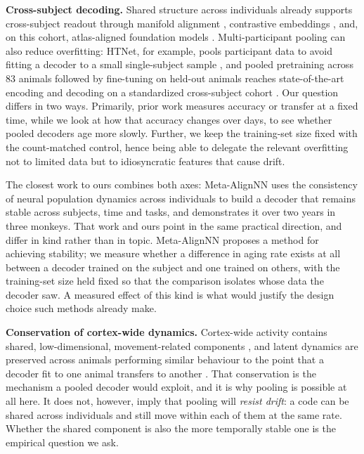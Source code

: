 \documentclass{article}
\begin{document}
\textbf{Cross-subject decoding.} Shared structure across individuals already supports cross-subject
readout through manifold alignment \citep{melbaum2022}, contrastive embeddings \citep{schneider2023},
and, on this cohort, atlas-aligned foundation models \citep{wicat2026}. Multi-participant pooling can
also reduce overfitting: HTNet, for example, pools participant data to avoid fitting a decoder to a
small single-subject sample \citep{peterson2021}, and pooled pretraining across 83 animals followed
by fine-tuning on held-out animals reaches state-of-the-art encoding and decoding on a standardized
cross-subject cohort \citep{neds2025}. Our question differs in two ways. Primarily, prior work
measures accuracy or transfer at a fixed time, while we look at how that accuracy changes over days,
to see whether pooled decoders age more slowly. Further, we keep the training-set size fixed with the
count-matched control, hence being able to delegate the relevant overfitting not to limited data but
to idiosyncratic features that cause drift.

The closest work to ours combines both axes: Meta-AlignNN \citep{metaalign2025} uses the consistency
of neural population dynamics across individuals to build a decoder that remains stable across
subjects, time and tasks, and demonstrates it over two years in three monkeys. That work and ours
point in the same practical direction, and differ in kind rather than in topic. Meta-AlignNN proposes
a method for achieving stability; we measure whether a difference in aging rate exists at all between
a decoder trained on the subject and one trained on others, with the training-set size held fixed so
that the comparison isolates whose data the decoder saw. A measured effect of this kind is what would
justify the design choice such methods already make.

\textbf{Conservation of cortex-wide dynamics.} Cortex-wide activity contains shared,
low-dimensional, movement-related components \citep{musall2019,macdowell2020,macdowell2024}, and
latent dynamics are preserved across animals performing similar behaviour to the point that a decoder
fit to one animal transfers to another \citep{safaie2023}. That conservation is the mechanism a
pooled decoder would exploit, and it is why pooling is possible at all here. It does not, however,
imply that pooling will \emph{resist drift}: a code can be shared across individuals and still move
within each of them at the same rate. Whether the shared component is also the more temporally stable
one is the empirical question we ask.
\end{document}
